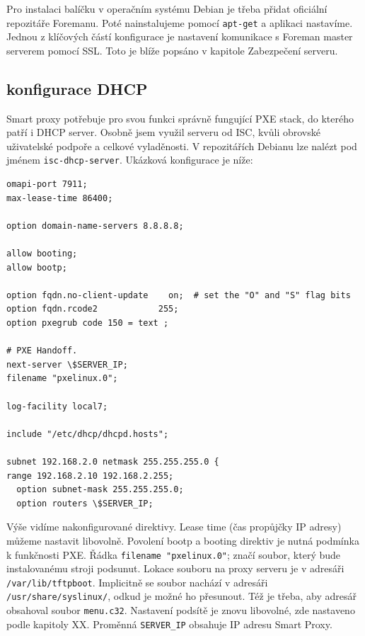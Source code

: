 \documentclass[thesis=B,czech]{FITthesis}[2012/06/26]
\begin{document}
Pro instalaci balíčku v operačním systému Debian je třeba přidat oficiální repozitáře Foremanu. \cite{fproxy-install} Poté nainstalujeme pomocí \texttt{apt-get} a aplikaci nastavíme. Jednou z klíčových částí konfigurace je nastavení komunikace s Foreman master serverem pomocí SSL. Toto je blíže popsáno v kapitole Zabezpečení serveru.
\subsection{konfigurace DHCP}


Smart proxy potřebuje pro svou funkci správně fungující PXE stack, do kterého patří i DHCP server. Osobně jsem využil serveru od ISC, kvůli obrovské uživatelské podpoře a celkové vyladěnosti. V repozitářích Debianu lze nalézt pod jménem \texttt{isc-dhcp-server}. Ukázková konfigurace je níže:

\begin{verbatim}
omapi-port 7911;
max-lease-time 86400;

option domain-name-servers 8.8.8.8;

allow booting;
allow bootp;

option fqdn.no-client-update    on;  # set the "O" and "S" flag bits
option fqdn.rcode2            255;
option pxegrub code 150 = text ;

# PXE Handoff.
next-server \$SERVER_IP;
filename "pxelinux.0";

log-facility local7;

include "/etc/dhcp/dhcpd.hosts";

subnet 192.168.2.0 netmask 255.255.255.0 {
range 192.168.2.10 192.168.2.255;
  option subnet-mask 255.255.255.0;
  option routers \$SERVER_IP;
\end{verbatim}


Výše vidíme nakonfigurované direktivy. Lease time (čas propůjčky IP adresy) můžeme nastavit libovolně. Povolení bootp a booting direktiv je nutná podmínka k funkčnosti PXE. Řádka \texttt{filename "pxelinux.0"}; značí soubor, který bude instalovanému stroji podsunut. Lokace souboru na proxy serveru je v adresáři \texttt{/var/lib/tftpboot}. Implicitně se soubor nachází v adresáři \texttt{/usr/share/syslinux/}, odkud je možné ho přesunout. Též je třeba, aby adresář obsahoval soubor \texttt{menu.c32}. Nastavení podsítě je znovu libovolné, zde nastaveno podle kapitoly XX. Proměnná \texttt{SERVER_IP} obsahuje IP adresu Smart Proxy.
\end{document}
